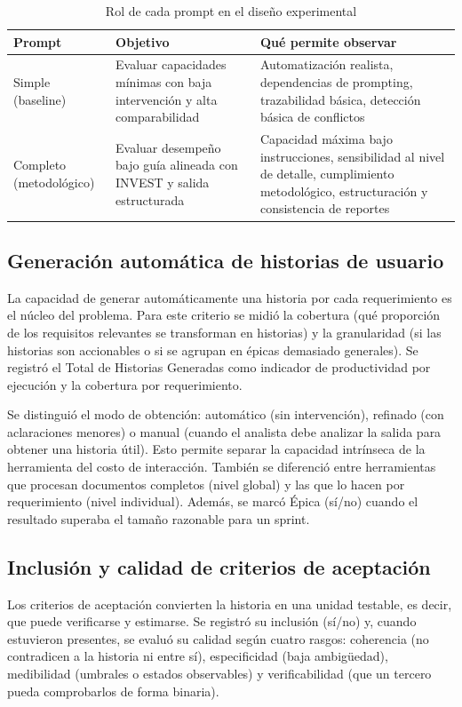 \begin{table}[ht]
\centering
\caption{Rol de cada prompt en el diseño experimental}
\begin{tabular}{|p{1.5cm} |p{4cm} |p{5cm}|}
\hline
\textbf{Prompt} & \textbf{Objetivo} & \textbf{Qué permite observar} \\
\hline
Simple (baseline) & Evaluar capacidades mínimas con baja intervención y alta comparabilidad & Automatización realista, dependencias de prompting, trazabilidad básica, detección básica de conflictos \\
Completo (metodológico) & Evaluar desempeño bajo guía alineada con INVEST y salida estructurada & Capacidad máxima bajo instrucciones, sensibilidad al nivel de detalle, cumplimiento metodológico, estructuración y consistencia de reportes \\
\hline
\end{tabular}
\end{table}


\subsection{Generación automática de historias de usuario}

La capacidad de generar automáticamente una historia por cada requerimiento es el núcleo del problema. Para este criterio se midió la cobertura (qué proporción de los requisitos relevantes se transforman en historias) y la granularidad (si las historias son accionables o si se agrupan en épicas demasiado generales). Se registró el Total de Historias Generadas como indicador de productividad por ejecución y la cobertura por requerimiento. 

Se distinguió el modo de obtención: automático (sin intervención), refinado (con aclaraciones menores) o manual (cuando el analista debe analizar la salida para obtener una historia útil). Esto permite separar la capacidad intrínseca de la herramienta del costo de interacción. También se diferenció entre herramientas que procesan documentos completos (nivel global) y las que lo hacen por requerimiento (nivel individual). Además, se marcó Épica (sí/no) cuando el resultado superaba el tamaño razonable para un sprint.

\subsection{Inclusión y calidad de criterios de aceptación}

Los criterios de aceptación convierten la historia en una unidad testable, es decir, que puede verificarse y estimarse. Se registró su inclusión (sí/no) y, cuando estuvieron presentes, se evaluó su calidad según cuatro rasgos: coherencia (no contradicen a la historia ni entre sí), especificidad (baja ambigüedad), medibilidad (umbrales o estados observables) y verificabilidad (que un tercero pueda comprobarlos de forma binaria).

